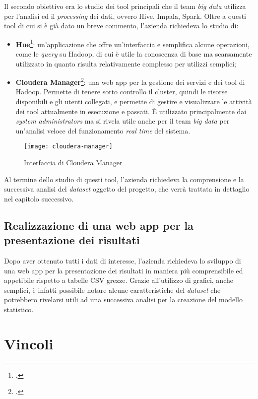 Il secondo obiettivo era lo studio dei tool principali che il team \textit{big data} utilizza per l'analisi ed il \textit{processing} dei dati, ovvero Hive, Impala, Spark. Oltre a questi tool di cui si è già dato un breve commento, l'azienda richiedeva lo studio di:
\begin{itemize}
	\item \textbf{Hue}\footcite{http://gethue.com/}: un'applicazione che offre un'interfaccia e semplifica alcune operazioni, come le \textit{query} su Hadoop, di cui è utile la conoscenza di base ma scarsamente utilizzato in quanto risulta relativamente complesso per utilizzi semplici;
	\item \textbf{Cloudera Manager}\footcite{https://www.cloudera.com/products/product-components/cloudera-manager.html}: una web app per la gestione dei servizi e dei tool di Hadoop. Permette di tenere sotto controllo il cluster, quindi le risorse disponibili e gli utenti collegati, e permette di gestire e visualizzare le attività dei tool attualmente in esecuzione e passati. È utilizzato principalmente dai \textit{system administrators} ma si rivela utile anche per il team \textit{big data} per un'analisi veloce del funzionamento \textit{real time} del sistema.
\end{itemize} 
\begin{figure}[!h] 
	\centering 
	\texttt{[image: cloudera-manager]}
	\caption{Interfaccia di Cloudera Manager}
\end{figure}
Al termine dello studio di questi tool, l'azienda richiedeva la comprensione e la successiva analisi del \textit{dataset} oggetto del progetto, che verrà trattata in dettaglio nel capitolo successivo.
\subsection{Realizzazione di una web app per la presentazione dei risultati}
Dopo aver ottenuto tutti i dati di interesse, l'azienda richiedeva lo sviluppo di una \gls{web app} per la presentazione dei risultati in maniera più comprensibile ed appetibile rispetto a tabelle \gls{CSV} grezze. Grazie all'utilizzo di grafici, anche semplici, è infatti possibile notare alcune caratteristiche del \textit{dataset} che potrebbero rivelarsi utili ad una successiva analisi per la creazione del modello statistico.
\section{Vincoli}
